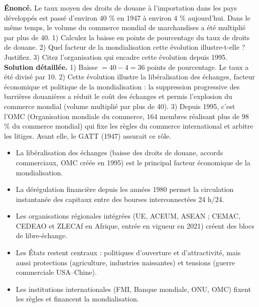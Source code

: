 \documentclass[11pt]{article}
\newcommand{\cle}[1]{{\popxbold\color{popdark}#1}}
\begin{document}
\begin{exoresolu}
\textbf{Énoncé.} Le taux moyen des droits de douane à l'importation dans les pays développés est passé d'environ 40 \% en 1947 à environ 4 \% aujourd'hui. Dans le même temps, le volume du commerce mondial de marchandises a été multiplié par plus de 40. 1) Calculez la baisse en points de pourcentage du taux de droits de douane. 2) Quel facteur de la mondialisation cette évolution illustre-t-elle ? Justifiez. 3) Citez l'organisation qui encadre cette évolution depuis 1995.
\tcblower
\textbf{Solution détaillée.}
1) Baisse $= 40 - 4 = 36$ points de pourcentage. Le taux a été divisé par 10.
2) Cette évolution illustre la \cle{libéralisation des échanges}, facteur économique et politique de la mondialisation : la suppression progressive des barrières douanières a réduit le coût des échanges et permis l'explosion du commerce mondial (volume multiplié par plus de 40).
3) Depuis 1995, c'est l'\cle{OMC} (Organisation mondiale du commerce, 164 membres réalisant plus de 98 \% du commerce mondial) qui fixe les règles du commerce international et arbitre les litiges. Avant elle, le GATT (1947) assurait ce rôle.
\end{exoresolu}

\begin{aretenir}
\begin{itemize}
\item La \cle{libéralisation des échanges} (baisse des droits de douane, accords commerciaux, OMC créée en 1995) est le principal facteur économique de la mondialisation.
\item La \cle{dérégulation financière} depuis les années 1980 permet la circulation instantanée des capitaux entre des bourses interconnectées 24 h/24.
\item Les \cle{organisations régionales intégrées} (UE, ACEUM, ASEAN ; CEMAC, CEDEAO et ZLECAf en Afrique, entrée en vigueur en 2021) créent des blocs de libre-échange.
\item Les \cle{États} restent centraux : politiques d'ouverture et d'attractivité, mais aussi protections (agriculture, industries naissantes) et tensions (guerre commerciale USA--Chine).
\item Les \cle{institutions internationales} (FMI, Banque mondiale, ONU, OMC) fixent les règles et financent la mondialisation.
\end{itemize}
\end{aretenir}
\end{document}
